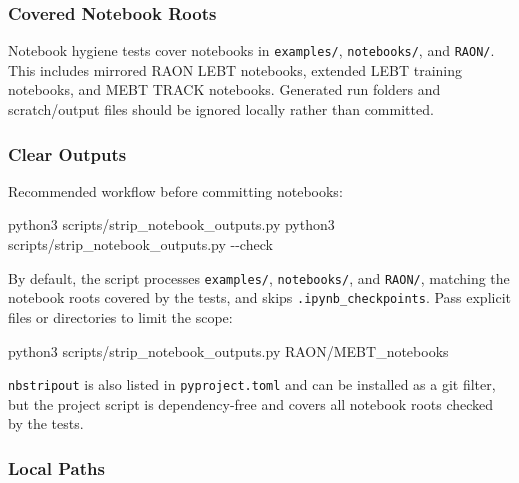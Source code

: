 \documentclass[
]{article}
\newenvironment{Shaded}{}{}
\newcommand{\AttributeTok}[1]{\textcolor[rgb]{0.49,0.56,0.16}{#1}}
\newcommand{\ExtensionTok}[1]{#1}
\newcommand{\NormalTok}[1]{#1}
\begin{document}
\hypertarget{covered-notebook-roots}{%
\subsubsection{Covered Notebook Roots}\label{covered-notebook-roots}}

Notebook hygiene tests cover notebooks in \texttt{examples/},
\texttt{notebooks/}, and \texttt{RAON/}. This includes mirrored RAON
LEBT notebooks, extended LEBT training notebooks, and MEBT TRACK
notebooks. Generated run folders and scratch/output files should be
ignored locally rather than committed.

\hypertarget{clear-outputs}{%
\subsubsection{Clear Outputs}\label{clear-outputs}}

Recommended workflow before committing notebooks:

\begin{Shaded}
\begin{Highlighting}[]
\ExtensionTok{python3}\NormalTok{ scripts/strip\_notebook\_outputs.py}
\ExtensionTok{python3}\NormalTok{ scripts/strip\_notebook\_outputs.py }\AttributeTok{{-}{-}check}
\end{Highlighting}
\end{Shaded}

By default, the script processes \texttt{examples/},
\texttt{notebooks/}, and \texttt{RAON/}, matching the notebook roots
covered by the tests, and skips \texttt{.ipynb\_checkpoints}. Pass
explicit files or directories to limit the scope:

\begin{Shaded}
\begin{Highlighting}[]
\ExtensionTok{python3}\NormalTok{ scripts/strip\_notebook\_outputs.py RAON/MEBT\_notebooks}
\end{Highlighting}
\end{Shaded}

\texttt{nbstripout} is also listed in \texttt{pyproject.toml} and can be
installed as a git filter, but the project script is dependency-free and
covers all notebook roots checked by the tests.

\hypertarget{local-paths}{%
\subsubsection{Local Paths}\label{local-paths}}
\end{document}
